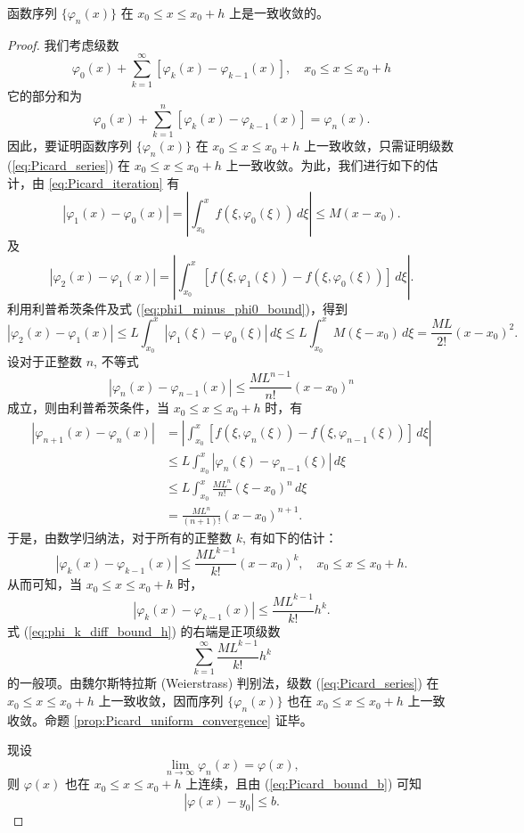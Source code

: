 \begin{proposition}[Picard逼近函数序列的一致收敛性]\label{prop:Picard_uniform_convergence}
    函数序列 $\{\varphi_n(x)\}$ 在 $x_0 \le x \le x_0+h$ 上是一致收敛的。
\end{proposition}
\begin{proof}
    我们考虑级数
\begin{equation}
\varphi_0(x) + \sum_{k=1}^\infty [\varphi_k(x)-\varphi_{k-1}(x)], \quad x_0 \le x \le x_0+h \label{eq:Picard_series}
\end{equation}
它的部分和为
$$\varphi_0(x) + \sum_{k=1}^n [\varphi_k(x)-\varphi_{k-1}(x)] = \varphi_n(x).$$
因此，要证明函数序列 $\{\varphi_n(x)\}$ 在 $x_0 \le x \le x_0+h$ 上一致收敛，只需证明级数 (\ref{eq:Picard_series}) 在 $x_0 \le x \le x_0+h$ 上一致收敛。为此，我们进行如下的估计，由 \eqref{eq:Picard_iteration} 有
\begin{equation}
|\varphi_1(x)-\varphi_0(x)| = \left|\int_{x_0}^{x} f(\xi,\varphi_0(\xi))\,d\xi\right| \le M(x-x_0). \label{eq:phi1_minus_phi0_bound}
\end{equation}
及
$$|\varphi_2(x)-\varphi_1(x)| = \left|\int_{x_0}^{x} [f(\xi,\varphi_1(\xi))-f(\xi,\varphi_0(\xi))]\,d\xi\right|.$$
利用利普希茨条件及式 (\ref{eq:phi1_minus_phi0_bound})，得到
$$|\varphi_2(x)-\varphi_1(x)| \le L \int_{x_0}^{x} |\varphi_1(\xi)-\varphi_0(\xi)|\,d\xi \le L \int_{x_0}^{x} M(\xi-x_0)\,d\xi = \frac{ML}{2!}(x-x_0)^2.$$
设对于正整数 $n$, 不等式
$$|\varphi_n(x)-\varphi_{n-1}(x)| \le \frac{ML^{n-1}}{n!}(x-x_0)^n$$
成立，则由利普希茨条件，当 $x_0 \le x \le x_0+h$ 时，有
\begin{align*}
|\varphi_{n+1}(x)-\varphi_n(x)| &= \left|\int_{x_0}^{x} [f(\xi,\varphi_n(\xi))-f(\xi,\varphi_{n-1}(\xi))]\,d\xi\right| \\
&\le L \int_{x_0}^{x} |\varphi_n(\xi)-\varphi_{n-1}(\xi)|\,d\xi \\
&\le L \int_{x_0}^{x} \frac{ML^n}{n!}(\xi-x_0)^n\,d\xi \\ %
&= \frac{ML^n}{(n+1)!}(x-x_0)^{n+1}.
\end{align*}
于是，由数学归纳法，对于所有的正整数 $k$, 有如下的估计：
\begin{equation}
|\varphi_k(x)-\varphi_{k-1}(x)| \le \frac{ML^{k-1}}{k!}(x-x_0)^k, \quad x_0 \le x \le x_0+h. \label{eq:phi_k_diff_bound_x}
\end{equation}
从而可知，当 $x_0 \le x \le x_0+h$ 时，
\begin{equation}
|\varphi_k(x)-\varphi_{k-1}(x)| \le \frac{ML^{k-1}}{k!}h^k. \label{eq:phi_k_diff_bound_h}
\end{equation}
式 (\ref{eq:phi_k_diff_bound_h}) 的右端是正项级数
$$\sum_{k=1}^\infty \frac{ML^{k-1}}{k!}h^k$$
的一般项。由魏尔斯特拉斯 (Weierstrass) 判别法，级数 (\ref{eq:Picard_series}) 在 $x_0 \le x \le x_0+h$ 上一致收敛，因而序列 $\{\varphi_n(x)\}$ 也在 $x_0 \le x \le x_0+h$ 上一致收敛。命题 \ref{prop:Picard_uniform_convergence} 证毕。

现设
$$\lim_{n\to\infty} \varphi_n(x) = \varphi(x),$$
则 $\varphi(x)$ 也在 $x_0 \le x \le x_0+h$ 上连续，且由 (\ref{eq:Picard_bound_b}) 可知
$$|\varphi(x)-y_0| \le b.$$
\end{proof}

